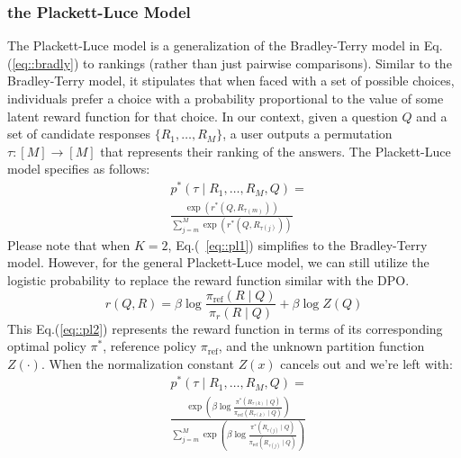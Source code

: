 \subsubsection{the Plackett-Luce Model}
\label{sec::PL}
The Plackett-Luce model \cite{luce1959individual} is a generalization of the Bradley-Terry\cite{bradley1952rank} model in Eq.(\ref{eq::bradly}) to rankings (rather than just pairwise comparisons). Similar to the Bradley-Terry model, it stipulates that when faced with a set of possible choices, individuals prefer a choice with a probability proportional to the value of some latent reward function for that choice.
In our context, given a question \( Q \) and a set of candidate responses \( \{R_1,\ldots, R_M\}\), a user outputs a permutation \( \tau: [M] \to [M] \) that represents their ranking of the answers. The Plackett-Luce model specifies as follows:
\begin{equation}
\begin{aligned}
    \label{eq::pl1}
   & p^*(\tau \mid R_1, \ldots, R_M, Q) = \\
   & \frac{\exp(r^*(Q, R_{\tau(m)}))}{\sum_{j=m}^M \exp(r^*(Q, R_{\tau(j)}))}
\end{aligned}
\end{equation}
Please note that when \( K = 2 \), Eq.(~\ref{eq::pl1}) simplifies to the Bradley-Terry model.
However, for the general Plackett-Luce model, we can still utilize the logistic probability to replace the reward function similar with the DPO.
\begin{equation}
    \label{eq::pl2}
    r(Q, R) = \beta \log \frac{\pi_{\text{ref}}(R \mid Q)}{\pi_r(R \mid Q)} + \beta \log Z(Q)
\end{equation}
This Eq.(\ref{eq::pl2}) represents the reward function in terms of its corresponding optimal policy \( \pi^* \), reference policy \( \pi_{\text{ref}} \), and the unknown partition function \( Z(\cdot) \).
When the normalization constant \( Z(x) \) cancels out and we’re left with:
\begin{equation}
\begin{aligned}
   & p^*(\tau \mid R_1, \ldots, R_M, Q) = \\
    & \frac{\exp \left( \beta \log \frac{\pi^*(R_{\tau(k)} \mid Q)}{\pi_{\text{ref}}(R_{\tau(k)} \mid Q)} \right)}{\sum_{j=m}^M \exp \left( \beta \log \frac{\pi^*(R_{\tau(j)} \mid Q)}{\pi_{\text{ref}}(R_{\tau(j)} \mid Q)} \right)}
\end{aligned}
\end{equation}

